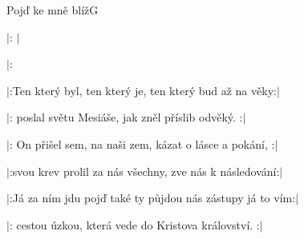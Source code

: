\begin{song}{Pojď ke mně blíž}{G}{}

\begin{SBVerse}

$|$: $|$

$|$: 

\end{SBVerse}

\begin{SBVerse}

$|$:Ten který byl, ten který je, ten který bud až na věky:$|$

$|$: poslal světu Mesiáše, jak zněl příslib odvěký. :$|$

\end{SBVerse}

\begin{SBVerse}

$|$: On přišel sem, na naši zem, kázat o lásce a pokání, :$|$

$|$:svou krev prolil za nás všechny, zve nás k následování:$|$

\end{SBVerse}

\begin{SBVerse}

$|$:Já za ním jdu pojď také ty půjdou nás zástupy já to vím:$|$

$|$: cestou úzkou, která vede do Kristova království. :$|$

\end{SBVerse}

\end{song}
